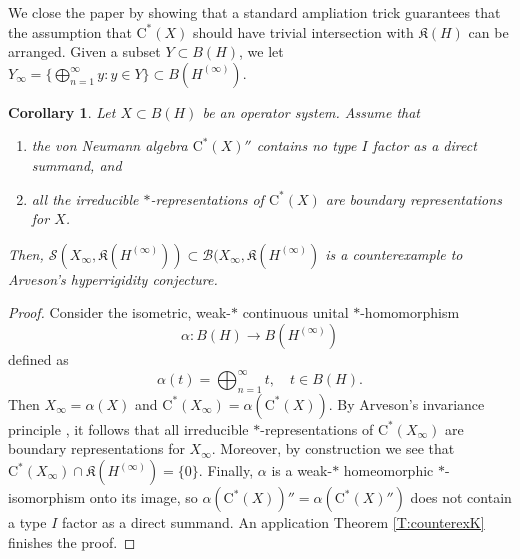 \documentclass[10pt]{amsart}
\newcommand{\B}{{\mathcal{B}}}
\renewcommand{\S}{{\mathcal{S}}}
\newcommand{\fK}{{\mathfrak{K}}}
\newcommand{\rC}{\mathrm{C}}
\newtheorem{corollary}[lemma]{Corollary}
\theoremstyle{definition}
\begin{document}
We close the paper by showing that a standard ampliation trick guarantees that the assumption that $\rC^*(X)$ should have trivial intersection with $\fK(H)$ can be arranged. Given a subset $Y\subset B(H)$, we let $Y_\infty=\{\bigoplus_{n=1}^\infty y: y\in Y\}\subset B(H^{(\infty)})$. 

\begin{corollary}\label{C:ampcounterex}
Let $X\subset B(H)$ be an operator system. Assume that 
\begin{enumerate}[{\rm (i)}]
\item the von Neumann algebra $\rC^*(X)''$ contains no type $I$ factor as a direct summand, and
\item all the irreducible $*$-representations of $\rC^*(X)$ are boundary representations for $X$.
\end{enumerate}
Then, $\S(X_\infty,\fK(H^{(\infty)}))\subset \B(X_\infty,\fK(H^{(\infty)})$ is a counterexample to Arveson's hyperrigidity conjecture.
\end{corollary}
\begin{proof}
Consider the isometric, weak-$*$ continuous unital $*$-homomorphism $$\alpha:B(H) \to B(H^{(\infty)})$$ defined as
\[
\alpha(t)=\bigoplus_{n=1}^\infty t, \quad t\in B(H).
\]
Then $X_\infty=\alpha(X)$ and $\rC^*(X_\infty)=\alpha(\rC^*(X))$. By Arveson's invariance principle  \cite[Theorem 2.1.2]{arveson1969}, it follows that all irreducible $*$-representations of $\rC^*(X_\infty)$ are boundary representations for $X_\infty$. Moreover, by construction we see that $\rC^*(X_\infty)\cap \fK(H^{(\infty)})=\{0\}$. Finally, $\alpha$ is a weak-$*$  homeomorphic $*$-isomorphism onto its image,  so $\alpha(\rC^*(X))''=\alpha(\rC^*(X)'')$ does not contain a type $I$ factor as a direct summand. An application  Theorem \ref{T:counterexK} finishes the proof.
\end{proof}





	
\end{document}
